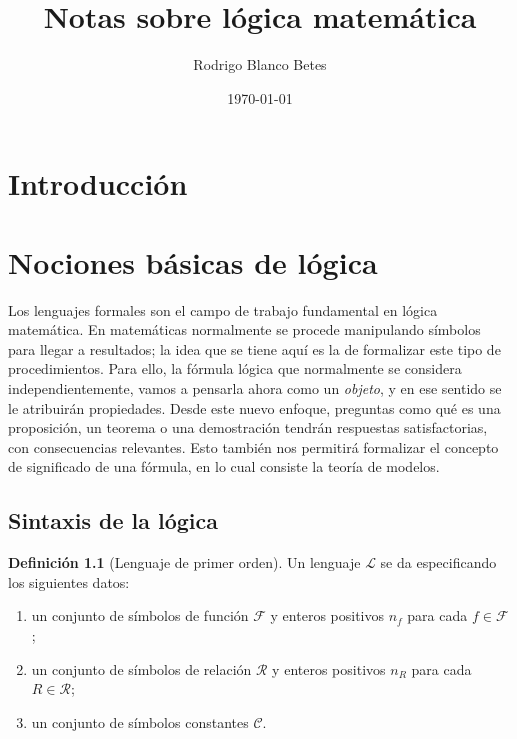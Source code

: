 \documentclass[11pt,a4paper]{book}
\title{\textbf{Notas sobre lógica matemática}}
\author{Rodrigo Blanco Betes}
\date{\today}
\theoremstyle{plain}
\theoremstyle{definition}
\newtheorem{definicion}[teorema]{Definición}
\theoremstyle{remark}
\begin{document}
\frontmatter
\maketitle

\tableofcontents

\chapter*{Introducción}

\mainmatter

\chapter{Nociones básicas de lógica} \label{nociones-basicas}

Los lenguajes formales son el campo de trabajo fundamental en lógica matemática. En matemáticas normalmente se procede manipulando símbolos para llegar a resultados; la idea que se tiene aquí es la de formalizar este tipo de procedimientos. Para ello, la fórmula lógica que normalmente se considera independientemente, vamos a pensarla ahora como un \textit{objeto}, y en ese sentido se le atribuirán propiedades. Desde este nuevo enfoque, preguntas como qué es una proposición, un teorema o una demostración tendrán respuestas satisfactorias, con consecuencias relevantes. Esto también nos permitirá formalizar el concepto de significado de una fórmula, en lo cual consiste la teoría de modelos.

\section{Sintaxis de la lógica}

\begin{definicion} [Lenguaje de primer orden]
  \label{lenguaje-L}
Un lenguaje $\mathcal{L}$ se da especificando los siguientes datos:
\begin{enumerate}
    \item un conjunto de símbolos de función $\mathcal{F}$ y enteros positivos $n_f$ para cada $f \in \mathcal{F}$;
    \item un conjunto de símbolos de relación $\mathcal{R}$ y enteros positivos $n_R$ para cada $R \in \mathcal{R}$;
    \item un conjunto de símbolos constantes $\mathcal{C}$.
\end{enumerate}
\end{definicion}
\end{document}
